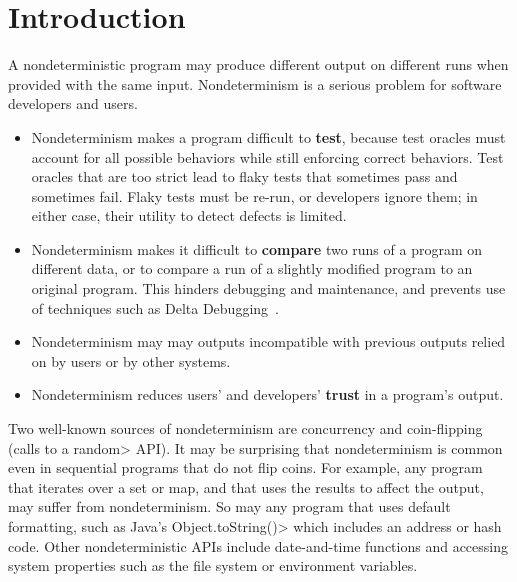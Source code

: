 \section{Introduction}

A nondeterministic program may produce different output on different runs
when provided with the same input.
Nondeterminism is a serious problem for software developers and users.
\begin{itemize}
\item
  Nondeterminism makes a program difficult to \textbf{test}, because test
  oracles must account for all possible behaviors while still enforcing
  correct behaviors.  Test oracles that are too strict lead to flaky tests
  that sometimes pass and sometimes fail.  Flaky tests must be re-run, or
  developers ignore them; in either case, their utility to detect defects
  is limited.
\item
  Nondeterminism makes it difficult to \textbf{compare} two runs of a
  program on different data, or to compare a run of a slightly modified
  program to an original program.  This hinders debugging and maintenance,
  and prevents use of techniques such as Delta Debugging~\cite{Zeller1999}.
\item
  Nondeterminism may may outputs incompatible with previous outputs relied
  on by users or by other systems.
\item
  Nondeterminism reduces users' and developers' \textbf{trust} in a program's output.
\end{itemize}

Two well-known sources of nondeterminism are concurrency
and coin-flipping
(calls to a \<random> API\@).
It may be surprising that nondeterminism is common even in sequential
programs that do not flip coins.
For example, any program that iterates over a set or map, and that uses the
results to affect the output, may suffer from nondeterminism.
So may any program that uses default formatting, such as Java's
\<Object.toString()> which includes an address or hash code.
Other nondeterministic APIs include date-and-time functions and
accessing system properties such as the file system or environment variables.

